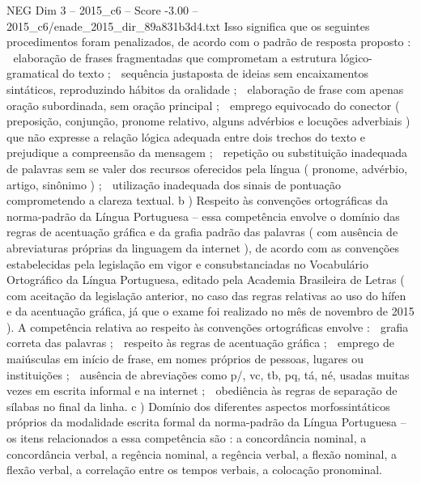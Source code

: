 \begin{textsample}{NEG Dim 3 – 2015\_c6 – Score -3.00 – 2015\_c6/enade\_2015\_dir\_89a831b3d4.txt}
Isso significa que os seguintes procedimentos foram penalizados, de acordo com o padrão de resposta proposto :  elaboração de frases fragmentadas que comprometam a estrutura lógico-gramatical do texto ;  sequência justaposta de ideias sem encaixamentos sintáticos, reproduzindo hábitos da oralidade ;  elaboração de frase com apenas oração subordinada, sem oração principal ;  emprego equivocado do conector ( preposição, conjunção, pronome relativo, alguns advérbios e locuções adverbiais ) que não expresse a relação lógica adequada entre dois trechos do texto e prejudique a compreensão da mensagem ;  repetição ou substituição inadequada de palavras sem se valer dos recursos oferecidos pela língua ( pronome, advérbio, artigo, sinônimo ) ;  utilização inadequada dos sinais de pontuação comprometendo a clareza textual. b ) Respeito às convenções ortográficas da norma-padrão da Língua Portuguesa – essa competência envolve o domínio das regras de acentuação gráfica e da grafia padrão das palavras ( com ausência de abreviaturas próprias da linguagem da internet ), de acordo com as convenções estabelecidas pela legislação em vigor e consubstanciadas no Vocabulário Ortográfico da Língua Portuguesa, editado pela Academia Brasileira de Letras ( com aceitação da legislação anterior, no caso das regras relativas ao uso do hífen e da acentuação gráfica, já que o exame foi realizado no mês de novembro de 2015 ).
A competência relativa ao respeito às convenções ortográficas envolve :  grafia correta das palavras ;  respeito às regras de acentuação gráfica ;  emprego de maiúsculas em início de frase, em nomes próprios de pessoas, lugares ou instituições ;  ausência de abreviações como p/, vc, tb, pq, tá, né, usadas muitas vezes em escrita informal e na internet ;  obediência às regras de separação de sílabas no final da linha. c ) Domínio dos diferentes aspectos morfossintáticos próprios da modalidade escrita formal da norma-padrão da Língua Portuguesa – os itens relacionados a essa competência são : a concordância nominal, a concordância verbal, a regência nominal, a regência verbal, a flexão nominal, a flexão verbal, a correlação entre os tempos verbais, a colocação pronominal.

\end{textsample}
